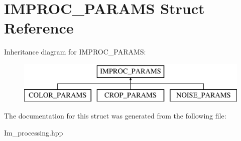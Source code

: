 \hypertarget{struct_i_m_p_r_o_c___p_a_r_a_m_s}{\section{I\+M\+P\+R\+O\+C\+\_\+\+P\+A\+R\+A\+M\+S Struct Reference}
\label{struct_i_m_p_r_o_c___p_a_r_a_m_s}
}
Inheritance diagram for I\+M\+P\+R\+O\+C\+\_\+\+P\+A\+R\+A\+M\+S\+:\begin{figure}[H]
\begin{center}
\leavevmode
\includegraphics[height=2.000000cm]{struct_i_m_p_r_o_c___p_a_r_a_m_s}
\end{center}
\end{figure}


The documentation for this struct was generated from the following file\+:\begin{DoxyCompactItemize}
\item 
Im\+\_\+processing.\+hpp\end{DoxyCompactItemize}
